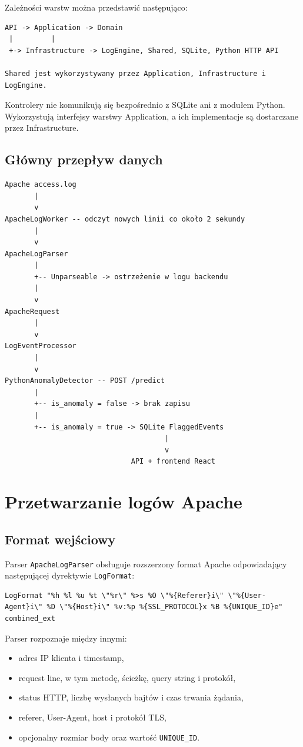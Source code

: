 \documentclass[12pt,a4paper]{article}
\newcommand{\code}[1]{\texttt{#1}}
\begin{document}
Zależności warstw można przedstawić następująco:

\begin{verbatim}
API -> Application -> Domain
 |         |
 +-> Infrastructure -> LogEngine, Shared, SQLite, Python HTTP API

Shared jest wykorzystywany przez Application, Infrastructure i LogEngine.
\end{verbatim}

Kontrolery nie komunikują się bezpośrednio z SQLite ani z modułem Python.
Wykorzystują interfejsy warstwy Application, a ich implementacje są dostarczane
przez Infrastructure.

\subsection{Główny przepływ danych}

\begin{verbatim}
Apache access.log
       |
       v
ApacheLogWorker -- odczyt nowych linii co około 2 sekundy
       |
       v
ApacheLogParser
       |
       +-- Unparseable -> ostrzeżenie w logu backendu
       |
       v
ApacheRequest
       |
       v
LogEventProcessor
       |
       v
PythonAnomalyDetector -- POST /predict
       |
       +-- is_anomaly = false -> brak zapisu
       |
       +-- is_anomaly = true -> SQLite FlaggedEvents
                                      |
                                      v
                              API + frontend React
\end{verbatim}

\section{Przetwarzanie logów Apache}

\subsection{Format wejściowy}

Parser \code{ApacheLogParser} obsługuje rozszerzony format Apache odpowiadający
następującej dyrektywie \code{LogFormat}:

\begin{lstlisting}
LogFormat "%h %l %u %t \"%r\" %>s %O \"%{Referer}i\" \"%{User-Agent}i\" %D \"%{Host}i\" %v:%p %{SSL_PROTOCOL}x %B %{UNIQUE_ID}e" combined_ext
\end{lstlisting}

Parser rozpoznaje między innymi:
\begin{itemize}
    \item adres IP klienta i timestamp,
    \item request line, w tym metodę, ścieżkę, query string i protokół,
    \item status HTTP, liczbę wysłanych bajtów i czas trwania żądania,
    \item referer, User-Agent, host i protokół TLS,
    \item opcjonalny rozmiar body oraz wartość \code{UNIQUE\_ID}.
\end{itemize}
\end{document}
